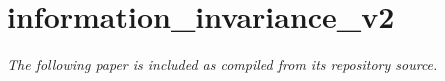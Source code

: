\chapter{information\_invariance\_v2}
\emph{The following paper is included as compiled from its repository source.}

